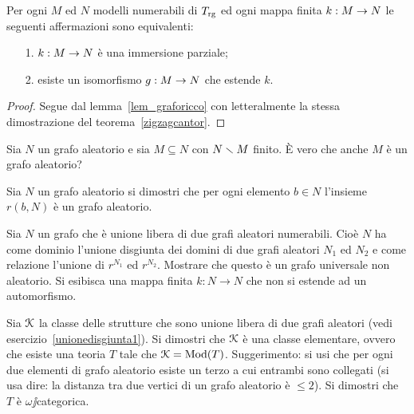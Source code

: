 \begin{corollary}\label{gaomegacat}
Per ogni $M$ ed $N$ modelli numerabili di $T_{\rm rg}$ ed ogni mappa finita $k:M\rightarrow N$ le seguenti affermazioni sono equivalenti:
\begin{itemize} 
\item[1.] $k:M\rightarrow N$ \`e una immersione parziale; 
\item[2.] esiste un isomorfismo $g:M\rightarrow N$ che estende $k$.
\end{itemize}
\end{corollary}
\begin{proof}
Segue dal lemma~\ref{lem_graforicco} con letteralmente la stessa dimostrazione del teorema~\ref{zigzagcantor}.
\end{proof}

\begin{exercise}
Sia $N$ un grafo aleatorio e sia $M\subseteq N$ con $N\smallsetminus M$ finito. \`E vero che anche $M$ \`e un grafo aleatorio?\QED%
\end{exercise}

\begin{exercise}
Sia $N$ un grafo aleatorio si dimostri che per ogni elemento $b\in N$ l'insieme $r(b,N)$ \`e un grafo aleatorio.\QED
\end{exercise}

\begin{exercise}\label{unionedisgiunta1}
Sia $N$ un grafo che \`e unione libera di due grafi aleatori numerabili. Cio\`e $N$ ha come dominio l'unione disgiunta dei domini di due grafi aleatori $N_1$ ed $N_2$ e come relazione l'unione di $r^{N_1}$ ed $r^{N_2}$. Mostrare che questo \`e un grafo universale non aleatorio. Si esibisca una mappa finita $k:N\to N$ che non si estende ad un automorfismo.\QED
\end{exercise}

\begin{exercise}\label{unionedisgiunta2}
Sia $\EuScript K$ la classe delle strutture che sono unione libera di due grafi aleatori (vedi esercizio~\ref{unionedisgiunta1}). Si dimostri che $\EuScript K$ \`e una classe elementare, ovvero che esiste una teoria $T$ tale che $\EuScript K=\mathop\textrm{Mod}(T)$. Suggerimento: si usi che per ogni due elementi di grafo aleatorio esiste un terzo a cui entrambi sono collegati (si usa dire: la distanza tra due vertici di un grafo aleatorio \`e $\le 2$). Si dimostri che $T$ \`e $\omega\jj$categorica.\QED
\end{exercise}


